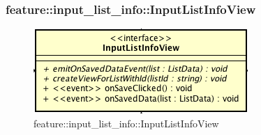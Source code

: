 \subsubsection{feature::input\_list\_info::InputListInfoView}

\label{feature::input_list_info::InputListInfoView}
\begin{figure}[ht]
	\centering
	\includegraphics[scale=0.5]{Sezioni/SottosezioniST/img/app/InputListInfoView.png}
	\caption{feature::input\_list\_info::InputListInfoView}
\end{figure}

